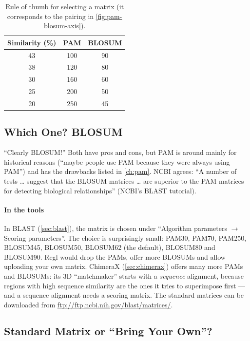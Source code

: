 \documentclass[11pt, oneside]{book}
\let\originalsubsection\subsection
\renewcommand{\subsection}{\Needspace{6\baselineskip}\originalsubsection}
\begin{document}
\begin{table}[htbp]
\centering
\small
\begin{tabular}{@{}ccc@{}}
\toprule
\textbf{Similarity (\%)} & \textbf{PAM} & \textbf{BLOSUM} \\
\midrule
43 & 100 & 90 \\
38 & 120 & 80 \\
30 & 160 & 60 \\
25 & 200 & 50 \\
20 & 250 & 45 \\
\bottomrule
\end{tabular}
\caption{Rule of thumb for selecting a matrix (it corresponds to the pairing in
\cref{fig:pam-blosum-axis}).}
\label{tab:rule-of-thumb}
\end{table}

\subsection{Which One? BLOSUM}

\begin{notebox}[title={Regl's advice --- likely exam material}]
``Clearly BLOSUM!'' Both have pros and cons, but PAM is around mainly for
historical reasons (``maybe people use PAM because they were always using
PAM'') and has the drawbacks listed in \cref{ch:pam}. NCBI agrees: ``A number
of tests \ldots{} suggest that the BLOSUM matrices \ldots{} are superior to
the PAM matrices for detecting biological relationships'' (NCBI's BLAST
tutorial).
\end{notebox}

\paragraph{In the tools}
In BLAST (\cref{sec:blast}), the matrix is chosen under ``Algorithm parameters
$\to$ Scoring parameters''. The choice is surprisingly small: PAM30, PAM70,
PAM250, BLOSUM45, BLOSUM50, BLOSUM62 (the default), BLOSUM80 and BLOSUM90.
Regl would drop the PAMs, offer more BLOSUMs and allow uploading your own
matrix. ChimeraX (\cref{sec:chimerax}) offers many more PAMs and BLOSUMs: its
3D ``matchmaker'' starts with a \emph{sequence} alignment, because regions with
high sequence similarity are the ones it tries to superimpose first --- and a
sequence alignment needs a scoring matrix. The standard matrices can be
downloaded from \url{ftp://ftp.ncbi.nih.gov/blast/matrices/}.

\subsection{Standard Matrix or ``Bring Your Own''?}
\end{document}
